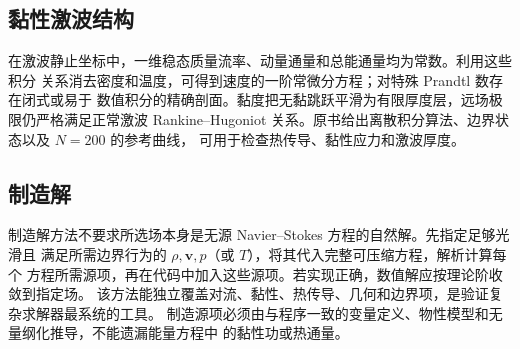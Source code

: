 \documentclass[11pt,a4paper,openany,fontset=none]{ctexbook}
\begin{document}
\subsection{黏性激波结构}
在激波静止坐标中，一维稳态质量流率、动量通量和总能通量均为常数。利用这些积分
关系消去密度和温度，可得到速度的一阶常微分方程；对特殊 Prandtl 数存在闭式或易于
数值积分的精确剖面。黏度把无黏跳跃平滑为有限厚度层，远场极限仍严格满足正常激波
Rankine--Hugoniot 关系。原书给出离散积分算法、边界状态以及 $N=200$ 的参考曲线，
可用于检查热传导、黏性应力和激波厚度。

\subsection{制造解}
制造解方法不要求所选场本身是无源 Navier--Stokes 方程的自然解。先指定足够光滑且
满足所需边界行为的 $\rho,\bm v,p$（或 $T$），将其代入完整可压缩方程，解析计算每个
方程所需源项，再在代码中加入这些源项。若实现正确，数值解应按理论阶收敛到指定场。
该方法能独立覆盖对流、黏性、热传导、几何和边界项，是验证复杂求解器最系统的工具。
制造源项必须由与程序一致的变量定义、物性模型和无量纲化推导，不能遗漏能量方程中
的黏性功或热通量。
\end{document}
